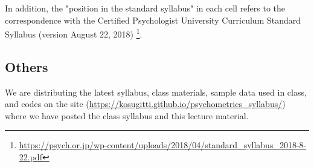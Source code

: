 


In addition, the "position in the standard syllabus" in each cell refers to the correspondence with the Certified Psychologist University Curriculum Standard Syllabus (version August 22, 2018) \footnote{\url{https://psych.or.jp/wp-content/uploads/2018/04/standard_syllabus_2018-8-22.pdf}}.

\subsection*{Others}
We are distributing the latest syllabus, class materials, sample data used in class, and codes on the site (\url{https://kosugitti.github.io/psychometrics_syllabus/}) where we have posted the class syllabus and this lecture material.
